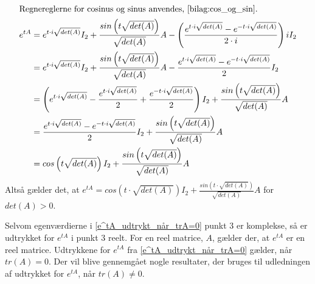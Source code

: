 \begin{bev}
\begin{itemize}
\begin{align*}
        \intertext{Regnereglerne for cosinus og sinus anvendes, \autoref{bilag:cos_og_sin}.}
        e^{tA}&= e^{t\cdot i\sqrt{det(A)}}I_2 + \frac{sin\left(t\sqrt{det(A)}\right)}{\sqrt{det(A)}}A - \left(\frac{e^{t\cdot i\sqrt{det(A)}}-e^{-t\cdot i\sqrt{det(A)}}}{2\cdot i}\right) iI_2\\
        &= e^{t\cdot i\sqrt{det(A)}}I_2 + \frac{sin\left(t\sqrt{det(A)}\right)}{\sqrt{det(A)}}A - \frac{{e^{t\cdot i\sqrt{det(A)}}-e^{-t\cdot i\sqrt{det(A)}}}}{2}I_2\\
        &= \left(e^{t\cdot i\sqrt{det(A)}} - \frac{e^{t\cdot i \sqrt{det(A)}}}{2} + \frac{e^{-t\cdot i \sqrt{det(A)}}}{2}\right) I_2 + \frac{sin\left(t\sqrt{det(A)}\right)}{\sqrt{det(A)}} A\\
        &= \frac{e^{t\cdot i\sqrt{det(A)}} - e^{-t\cdot i\sqrt{det(A)}}}{2} I_2 + \frac{sin\left(t\sqrt{det(A)}\right)}{\sqrt{det(A)}} A\\
        &= cos\left(t\sqrt{det(A)}\right) I_2 + \frac{sin\left(t\sqrt{det(A)}\right)}{\sqrt{det(A)}} A
    \end{align*}
    Altså gælder det, at $e^{tA} = cos\left(t\cdot \sqrt{det(A)}\right) I_2+ \frac{sin\left(t\cdot \sqrt{det(A)}\right)}{\sqrt{det(A)}} A$ for $det(A)>0$.
\end{itemize}
\end{bev}

Selvom egenværdierne i \autoref{e^tA_udtrykt_når_trA=0} punkt 3 er komplekse, så er udtrykket for $e^{tA}$ i punkt 3 reelt. For en reel matrice, $A$, gælder der, at $e^{tA}$ er en reel matrice. Udtrykkene for $e^{tA}$ fra \autoref{e^tA_udtrykt_når_trA=0} gælder, når $tr(A)=0$. Der vil blive gennemgået nogle resultater, der bruges til udledningen af udtrykket for $e^{tA}$, når $tr(A) \neq 0$. 


